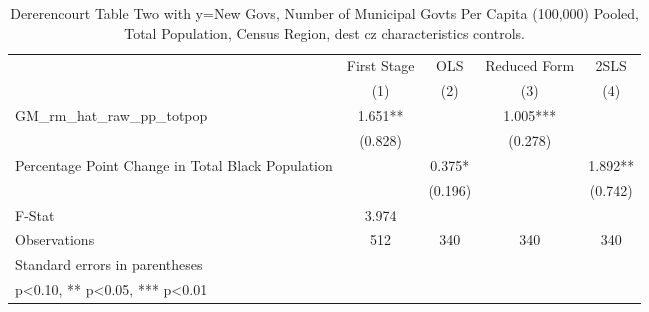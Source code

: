 \begin{table}[htbp]\centering
\def\sym#1{\ifmmode^{#1}\else\(^{#1}\)\fi}
\caption{Dererencourt Table Two with y=New Govs, Number of Municipal Govts Per Capita (100,000) Pooled, Total Population, Census Region, dest cz characteristics controls.}
\begin{tabular}{l*{4}{c}}
\toprule
                    & First Stage   &         OLS   &Reduced Form   &        2SLS   \\
                    &\multicolumn{1}{c}{(1)}   &\multicolumn{1}{c}{(2)}   &\multicolumn{1}{c}{(3)}   &\multicolumn{1}{c}{(4)}   \\
\midrule
GM\_rm\_hat\_raw\_pp\_totpop&       1.651** &               &       1.005***&               \\
                    &     (0.828)   &               &     (0.278)   &               \\
\addlinespace
Percentage Point Change in Total Black Population&               &       0.375*  &               &       1.892** \\
                    &               &     (0.196)   &               &     (0.742)   \\
\midrule
F-Stat              &       3.974   &               &               &               \\
Observations        &         512   &         340   &         340   &         340   \\
\bottomrule
\multicolumn{5}{l}{\footnotesize Standard errors in parentheses}\\
\multicolumn{5}{l}{\footnotesize * p<0.10, ** p<0.05, *** p<0.01}\\
\end{tabular}
\end{table}
